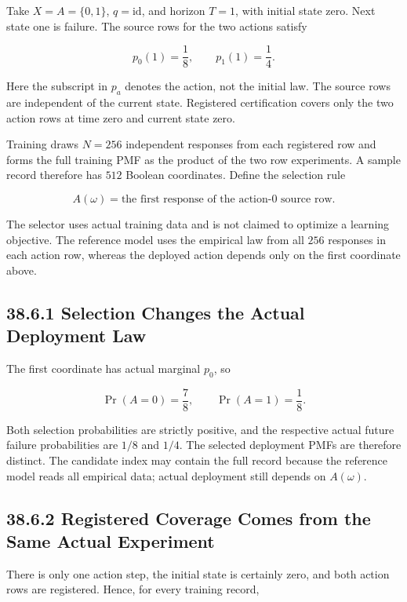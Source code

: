 \documentclass[
  english,
  11pt,
  oneside]{book}
\begin{document}
Take \(X=A=\{0,1\}\), \(q=\mathrm{id}\), and horizon \(T=1\), with initial state zero. Next state one is failure. The source rows for the two actions satisfy

\[p_0(1)=\frac18,\qquad p_1(1)=\frac14.\]

Here the subscript in \(p_a\) denotes the action, not the initial law. The source rows are independent of the current state. Registered certification covers only the two action rows at time zero and current state zero.

Training draws \(N=256\) independent responses from each registered row and forms the full training PMF as the product of the two row experiments. A sample record therefore has \(512\) Boolean coordinates. Define the selection rule

\[A(\omega)=\text{the first response of the action-0 source row}.\]

The selector uses actual training data and is not claimed to optimize a learning objective. The reference model uses the empirical law from all \(256\) responses in each action row, whereas the deployed action depends only on the first coordinate above.

\subsection{38.6.1 Selection Changes the Actual Deployment Law}\label{selection-changes-the-actual-deployment-law}

The first coordinate has actual marginal \(p_0\), so

\[\Pr(A=0)=\frac78,\qquad \Pr(A=1)=\frac18.\]

Both selection probabilities are strictly positive, and the respective actual future failure probabilities are \(1/8\) and \(1/4\). The selected deployment PMFs are therefore distinct. The candidate index may contain the full record because the reference model reads all empirical data; actual deployment still depends on \(A(\omega)\).

\subsection{38.6.2 Registered Coverage Comes from the Same Actual Experiment}\label{registered-coverage-comes-from-the-same-actual-experiment}

There is only one action step, the initial state is certainly zero, and both action rows are registered. Hence, for every training record,
\end{document}
